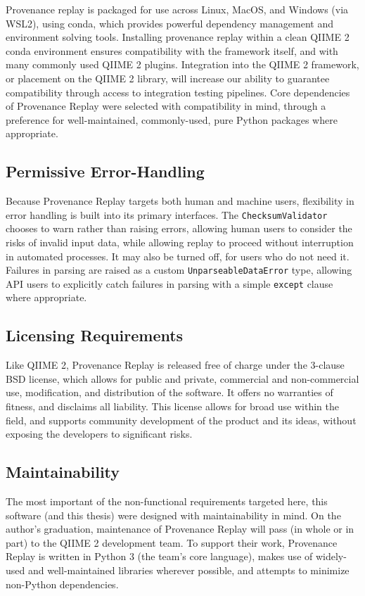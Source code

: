 Provenance replay is packaged for use across Linux, MacOS, and Windows (via
WSL2), using conda, which provides powerful dependency management and environment
solving tools. Installing provenance replay within a clean QIIME 2 conda
environment ensures compatibility with the framework itself, and with many
commonly used QIIME 2 plugins. Integration into the QIIME 2 framework, or
placement on the QIIME 2 library, will increase our ability to guarantee
compatibility through access to integration testing pipelines. Core dependencies
of Provenance Replay were selected with compatibility in mind, through a
preference for well-maintained, commonly-used, pure Python packages where
appropriate.

\subsection{Permissive Error-Handling}

Because Provenance Replay targets both human and machine users, flexibility in
error handling is built into its primary interfaces. The \texttt{ChecksumValidator}
chooses to warn rather than raising errors, allowing human users to consider the
risks of invalid input data, while allowing replay to proceed without
interruption in automated processes. It may also be turned off, for users who do
not need it. Failures in parsing are raised as a custom \texttt{UnparseableDataError}
type, allowing API users to explicitly catch failures in parsing with a simple
\texttt{except} clause where appropriate.

\subsection{Licensing Requirements}

Like QIIME 2, Provenance Replay is released free of charge under the 3-clause
BSD license, which allows for public and private, commercial and non-commercial
use, modification, and distribution of the software. It offers no warranties of
fitness, and disclaims all liability. This license allows for broad use within
the field, and supports community development of the product and its ideas,
without exposing the developers to significant risks.

\subsection{Maintainability}

The most important of the non-functional requirements targeted here, this
software (and this thesis) were designed with maintainability in mind. On the
author’s graduation, maintenance of Provenance Replay will pass (in whole or in
part) to the QIIME 2 development team. To support their work, Provenance Replay
is written in Python 3 (the team’s core language), makes use of widely-used and
well-maintained libraries wherever possible, and attempts to minimize non-Python
dependencies. 

